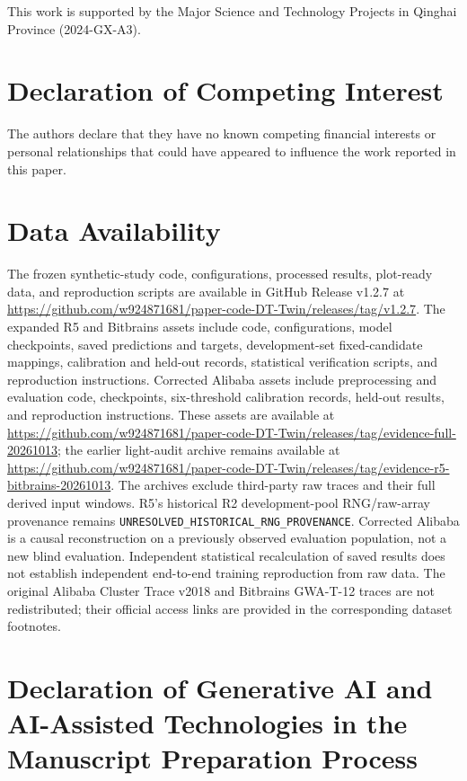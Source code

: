\documentclass[a4paper,fleqn]{cas-sc}
\begin{document}
This work is supported by the Major Science and Technology Projects in Qinghai
Province (2024-GX-A3).

\section*{Declaration of Competing Interest}

The authors declare that they have no known competing financial
interests or personal relationships that could have appeared to
influence the work reported in this paper.

\section*{Data Availability}

The frozen synthetic-study code, configurations, processed results,
plot-ready data, and reproduction scripts are available in GitHub Release
v1.2.7 at
\url{https://github.com/w924871681/paper-code-DT-Twin/releases/tag/v1.2.7}.
The expanded R5 and Bitbrains assets include code, configurations, model
checkpoints, saved predictions and targets, development-set fixed-candidate
mappings, calibration and held-out records, statistical verification scripts,
and reproduction instructions. Corrected Alibaba assets include preprocessing
and evaluation code, checkpoints, six-threshold calibration records,
held-out results, and reproduction instructions. These assets are available at
\url{https://github.com/w924871681/paper-code-DT-Twin/releases/tag/evidence-full-20261013};
the earlier light-audit archive remains available at
\url{https://github.com/w924871681/paper-code-DT-Twin/releases/tag/evidence-r5-bitbrains-20261013}.
The archives exclude third-party raw traces and their full derived input
windows. R5's historical R2 development-pool RNG/raw-array provenance remains
\texttt{UNRESOLVED\_HISTORICAL\_RNG\_PROVENANCE}. Corrected Alibaba is a causal
reconstruction on a previously observed evaluation population, not a new blind
evaluation. Independent statistical recalculation of saved results does not
establish independent end-to-end training reproduction from raw data. The original Alibaba Cluster Trace
v2018 and Bitbrains GWA-T-12 traces are not redistributed; their
official access links are provided in the corresponding dataset footnotes.

\section*{Declaration of Generative AI and AI-Assisted Technologies
in the Manuscript Preparation Process}
\end{document}
